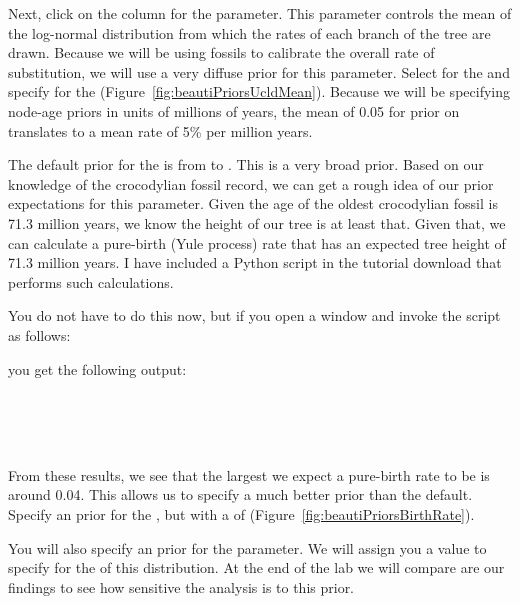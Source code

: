 {    Next, click on the  column for the
     parameter.
    This parameter controls the mean of the log-normal distribution from which
    the rates of each branch of the tree are drawn.
    Because we will be using fossils to calibrate the overall rate of substitution,
    we will use a very diffuse prior for this parameter.
    Select  for the 
    and specify  for the 
    (Figure~\ref{fig:beautiPriorsUcldMean}).
    Because we will be specifying node-age priors in units of millions of
    years, the mean of 0.05 for prior on 
    translates to a mean rate of 5\% per million years.


    The default prior for the 
    is  from  to .
    This is a very broad prior.
    Based on our knowledge of the crocodylian fossil record, we can get
    a rough idea of our prior expectations for this parameter.
    Given the age of the oldest crocodylian fossil is 71.3 million
    years, we know the height of our tree is at least that.
    Given that, we can calculate a pure-birth (Yule process) rate that has an
    expected tree height of 71.3 million years.
    I have included a Python script  in the tutorial
    download that performs such calculations.

\newpage

    You do not have to do this now, but if you open a 
    window and invoke the script as follows:

    \hspace{1cm}

    you get the following output:

    \\
    \\
    \\

    From these results, we see that the largest we expect a pure-birth rate to
    be is around 0.04.
    This allows us to specify a much better prior than the default.
    Specify an  prior for the
    , but with a  of
     (Figure~\ref{fig:beautiPriorsBirthRate}).


    You will also specify an  prior for the
     parameter.
    {\color{red}We will assign you a value to specify for the  of
    this distribution.}
    At the end of the lab we will compare are our findings to see how sensitive
    the analysis is to this prior.
}

